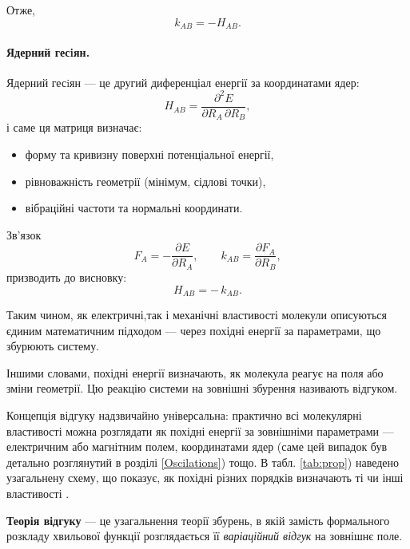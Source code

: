 Отже,
\[
	k_{AB} = -H_{AB}.
\]

\paragraph{Ядерний гесiян.}

Ядерний гесiян --- це другий диференціал енергії за координатами ядер:
\begin{equation}
	H_{AB} =
	\frac{\partial^2 E}{\partial R_A\,\partial R_B},
\end{equation}
і саме ця матриця визначає:

\begin{itemize}
	\item форму та кривизну поверхні потенціальної енергії,
	\item рівноважність геометрії (мінімум, сідлові точки),
	\item вібраційні частоти та нормальні координати.
\end{itemize}

Зв’язок
\[
	F_A = -\frac{\partial E}{\partial R_A}, \qquad
	k_{AB} = \frac{\partial F_A}{\partial R_B},
\]
призводить до висновку:
\[
	H_{AB} = -\,k_{AB}.
\]

Таким чином, як електричні,так і механічні властивості молекули
описуються єдиним математичним підходом --- через похідні енергії за параметрами, що збурюють систему.

Іншими словами, похідні енергії визначають, як молекула реагує на поля або зміни геометрії. Цю  реакцію системи на зовнішні збурення називають відгуком.

Концепція відгуку надзвичайно універсальна: практично всі молекулярні властивості можна розглядати як похідні енергії за зовнішніми параметрами --- електричним або магнітним полем, координатами ядер (саме цей випадок був детально розглянутий в розділі \ref{Oscilations}) тощо.
В табл. \ref{tab:prop}) наведено узагальнену схему, що показує, як похідні різних порядків визначають ті чи інші властивості .

\begin{commentbox}
	\textbf{Теорія відгуку} --- це узагальнення теорії збурень, в якій
	замість формального розкладу хвильової функції розглядається її \emph{варіаційний відгук} на зовнішнє поле.
\end{commentbox}




